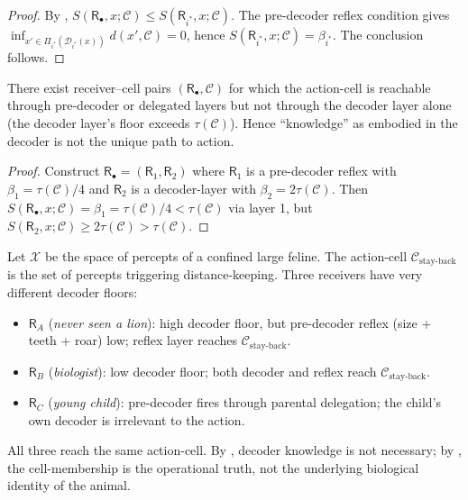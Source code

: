 \documentclass[twocolumn,11pt,a4paper]{article}
\newcommand{\D}{\mathcal{D}}
\newcommand{\X}{\mathcal{X}}
\newcommand{\Cell}{\mathcal{C}}
\newcommand{\receiver}{\mathsf{R}}
\begin{document}
\begin{proof}
By , $S(\receiver_\bullet,x;\Cell)\le
S(\receiver_{i^*},x;\Cell)$. The pre-decoder reflex condition gives
$\inf_{x'\in\Pi_{i^*}(\D_{i^*}(x))}d(x',\Cell)=0$, hence
$S(\receiver_{i^*},x;\Cell)=\beta_{i^*}$. The conclusion follows.
\end{proof}

\begin{corollary}\label{cor:not-unique}
There exist receiver--cell pairs $(\receiver_\bullet,\Cell)$ for which the
action-cell is reachable through pre-decoder or delegated layers but not
through the decoder layer alone (the decoder layer's floor exceeds
$\tau(\Cell)$). Hence ``knowledge'' as embodied in the decoder is not the
unique path to action.
\end{corollary}

\begin{proof}
Construct $\receiver_\bullet=(\receiver_1,\receiver_2)$ where $\receiver_1$
is a pre-decoder reflex with $\beta_1=\tau(\Cell)/4$ and $\receiver_2$ is a
decoder-layer with $\beta_2=2\tau(\Cell)$. Then
$S(\receiver_\bullet,x;\Cell)=\beta_1=\tau(\Cell)/4<\tau(\Cell)$ via layer
1, but $S(\receiver_2,x;\Cell)\ge 2\tau(\Cell)>\tau(\Cell)$.
\end{proof}

\begin{example}\label{ex:zoo}
Let $\X$ be the space of percepts of a confined large feline. The
action-cell $\Cell_{\text{stay-back}}$ is the set of percepts triggering
distance-keeping. Three receivers have very different decoder floors:
\begin{itemize}[leftmargin=*]
\item $\receiver_A$ (\emph{never seen a lion}): high decoder floor, but
pre-decoder reflex (size + teeth + roar) low; reflex layer reaches
$\Cell_{\text{stay-back}}$.
\item $\receiver_B$ (\emph{biologist}): low decoder floor; both decoder and
reflex reach $\Cell_{\text{stay-back}}$.
\item $\receiver_C$ (\emph{young child}): pre-decoder fires through
parental delegation; the child's own decoder is irrelevant to the action.
\end{itemize}
All three reach the same action-cell. By , decoder
knowledge is not necessary; by , the cell-membership
is the operational truth, not the underlying biological identity of the
animal.
\end{example}
\end{document}
